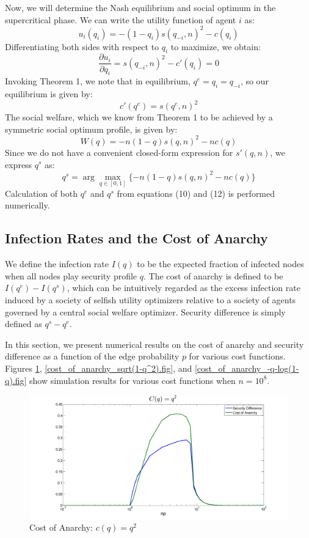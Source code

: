 \documentclass{article}
\theoremstyle{plain}
\begin{document}
Now, we will determine the Nash equilibrium and social optimum in the supercritical phase. We can write the utility function of agent $i$ as:
\begin{equation}
	u_i(q_i) = -(1-q_i)s(q_{-i},n)^2 - c(q_i)
\end{equation}
Differentiating both sides with respect to $q_i$ to maximize, we obtain:
\begin{equation}
	\frac{\partial u_i}{\partial q_i} = s(q_{-i},n)^2 - c'(q_i) = 0
\end{equation}
Invoking Theorem 1, we note that in equilibrium, $q^e = q_i = q_{-i}$, so our equilibrium is given by:
\begin{equation}
	c'(q^e) = s(q^e, n)^2
\end{equation}
The social welfare, which we know from Theorem 1 to be achieved by a symmetric social optimum profile, is given by:
\begin{equation}
	W(q) = -n(1-q)s(q,n)^2 - nc(q)
\end{equation}
Since we do not have a convenient closed-form expression for $s'(q, n)$, we express $q^s$ as:
\begin{equation}
	q^s = \arg\max\limits_{q\in[0,1]}\{-n(1-q)s(q,n)^2 - nc(q)\}
\end{equation}
Calculation of both $q^e$ and $q^s$ from equations (10) and (12) is performed numerically.
\subsection{Infection Rates and the Cost of Anarchy}
We define the infection rate $I(q)$ to be the expected fraction of infected nodes when all nodes play security profile $q$. The cost of anarchy is defined to be $I(q^e) - I(q^s)$, which can be intuitively regarded as the excess infection rate induced by a society of selfish utility optimizers relative to a society of agents governed by a central social welfare optimizer. Security difference is simply defined as $q^s - q^e$. 

In this section, we present numerical results on the cost of anarchy and security difference as a function of the edge probability $p$ for various cost functions. Figures \ref{cost_of_anarchy_q^2.fig}, \ref{cost_of_anarchy_sqrt(1-q^2).fig}, and \ref{cost_of_anarchy_-q-log(1-q).fig} show simulation results for various cost functions when $n=10^8$.

\begin{figure}[h!]
  \centering
  \includegraphics[width=6in]{cost_of_anarchy_q^2.png}
  \caption{Cost of Anarchy: $c(q) = q^2$}
  \label{cost_of_anarchy_q^2.fig}
\end{figure}
\end{document}
